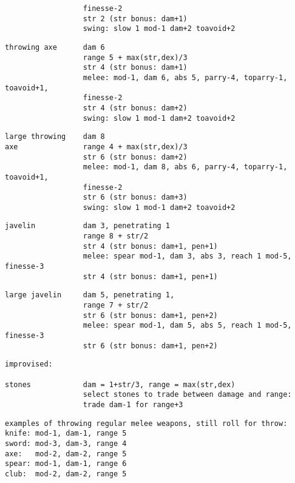 \begin{samepage}
\begin{verbatim}
                  finesse-2
                  str 2 (str bonus: dam+1)
                  swing: slow 1 mod-1 dam+2 toavoid+2
\end{verbatim} \blocklistgap \begin{verbatim}
throwing axe      dam 6
                  range 5 + max(str,dex)/3
                  str 4 (str bonus: dam+1)
                  melee: mod-1, dam 6, abs 5, parry-4, toparry-1, toavoid+1, 
                  finesse-2
                  str 4 (str bonus: dam+2)
                  swing: slow 1 mod-1 dam+2 toavoid+2
\end{verbatim} \blocklistgap \begin{verbatim}
large throwing    dam 8
axe               range 4 + max(str,dex)/3
                  str 6 (str bonus: dam+2)
                  melee: mod-1, dam 8, abs 6, parry-4, toparry-1, toavoid+1, 
                  finesse-2
                  str 6 (str bonus: dam+3)
                  swing: slow 1 mod-1 dam+2 toavoid+2
\end{verbatim} \blocklistgap \begin{verbatim}
javelin           dam 3, penetrating 1
                  range 8 + str/2
                  str 4 (str bonus: dam+1, pen+1)
                  melee: spear mod-1, dam 3, abs 3, reach 1 mod-5, finesse-3
                  str 4 (str bonus: dam+1, pen+1)
\end{verbatim} \blocklistgap \begin{verbatim}
large javelin     dam 5, penetrating 1,
                  range 7 + str/2
                  str 6 (str bonus: dam+1, pen+2)
                  melee: spear mod-1, dam 5, abs 5, reach 1 mod-5, finesse-3
                  str 6 (str bonus: dam+1, pen+2)
\end{verbatim} \blocklistgap \begin{verbatim}
improvised:

stones            dam = 1+str/3, range = max(str,dex) 
                  select stones to trade between damage and range:
                  trade dam-1 for range+3
\end{verbatim} \blocklistgap \begin{verbatim}
examples of throwing regular melee weapons, still roll for throw:
knife: mod-1, dam-1, range 5
sword: mod-3, dam-3, range 4
axe:   mod-2, dam-2, range 5
spear: mod-1, dam-1, range 6
club:  mod-2, dam-2, range 5
\end{verbatim} \end{samepage} \normalsize \goodbreak

